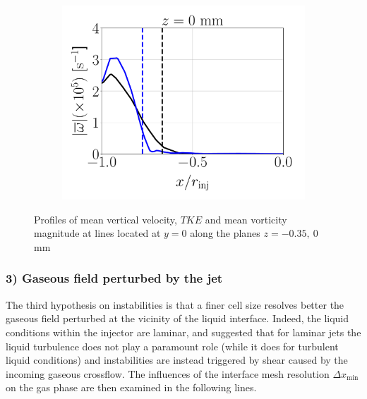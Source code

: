 \begin{figure}[ht]
\begin{subfigure}[b]{0.3\textwidth}
	\flushleft
   \includegraphics[scale=0.225]{./part2_developments/figures_ch5_resolved_JICF/instabilities_resolution/line_data_injector_vort_z0p00}
\end{subfigure}

   \caption{Profiles of mean vertical velocity, $TKE$ and mean vorticity magnitude at lines located at $y = 0$ along the planes $z = -0.35,~0$ mm}
\label{fig:jicf_data_lines_inside_injector}
\end{figure}


\subsubsection*{3) Gaseous field perturbed by the jet}



The third hypothesis on instabilities is that a finer cell size resolves better the gaseous field perturbed at the vicinity of the liquid interface. Indeed, the liquid conditions within the injector are laminar, and  suggested that for laminar jets the liquid turbulence does not play a paramount role (while it does for turbulent liquid conditions) and instabilities are instead triggered by shear caused by the incoming gaseous crossflow. The influences of the interface mesh resolution $\Delta x_\mathrm{min}$ on the gas phase are then examined in the following lines.




